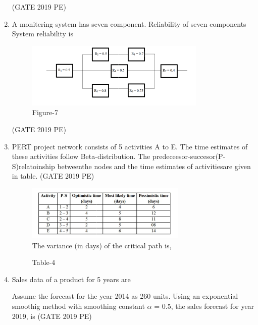 \documentclass[journal,12pt,onecolumn]{exam}
\theoremstyle{remark}
\begin{document}
\begin{enumerate}
\hfill{(GATE 2019 PE)}\\

\item A monitering system has seven component. Reliability of seven components  System reliability is\\
\begin{figure}[H]
    \centering
    \includegraphics[width=0.5\linewidth]{figs/fig7.png}
    \caption{Figure-7}
    \label{fig:figs/fig7.png}
\end{figure}

\hfill{(GATE 2019 PE)}\\

\item PERT project network consists of 5 activities A to E. The time estimates of these activities follow Beta-distribution. The predeceesor-succesor(P-S)relatoinship betweenthe nodes and the time estimates of activitiesare given in table.
\hfill{(GATE 2019 PE)}\\
\begin{figure}[H]
    \centering
    \includegraphics[width=1\linewidth]{figs/fig8.png}\\
    The variance (in days) of the critical path is,
    \caption{Table-4}
    \label{fig:figs/fig8.png}
\end{figure}
\item Sales data of a product for 5 years are


Assume the forecast for the year 2014 as 260 units. Using an exponential smoothig method with smoothing constant $\alpha$ = 0.5, the sales forecast for year 2019, is
\hfill{(GATE 2019 PE)}\\


\end{enumerate}
\end{document}
